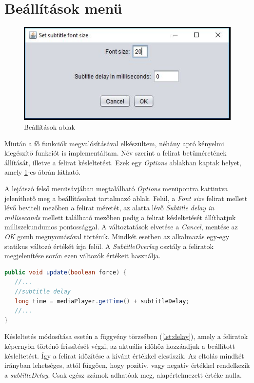 \section{Beállítások menü}

\begin{figure}[h!]
\centering
  \includegraphics[width=0.8\linewidth]{images/options.jpg}
  \caption{Beállítások ablak}
  \label{fig:options}
\end{figure}

Miután a fő funkciók megvalósításával elkészültem, néhány apró kényelmi kiegészítő funkciót is implementáltam. Név szerint a felirat betűméretének állítását, illetve a felirat késleltetést. Ezek egy \textit{Options} ablakban kaptak helyet, amely \ref{fig:options}-es ábrán látható.

A lejátszó felső menüsávjában megtalálható \textit{Options} menüpontra kattintva jeleníthető meg a beállításokat tartalmazó ablak. Felül, a \textit{Font size} felirat mellett lévő beviteli mezőben a felirat méretét, az alatta lévő \textit{Subtitle delay in milliseconds} mellett található mezőben pedig a felirat késleltetését állíthatjuk milliszekundumos pontossággal. A változtatások elvetése a \textit{Cancel}, mentése az \textit{OK} gomb megnyomásával történik. Mindkét esetben az alkalmazás egy-egy statikus változó értékét írja felül. A \textit{SubtitleOverlay} osztály a feliratok megjelenítése során ezen változók értékeit használja.

\begin{lstlisting}[caption=Feliratok késleltetése, label={lst:delay}, language=java]
public void update(boolean force) {
   //...
   //subtitle delay
   long time = mediaPlayer.getTime() + subtitleDelay;
   //...
}
\end{lstlisting}

Késleltetés módosítása esetén a függvény törzsében (\ref{lst:delay}), amely a feliratok képernyőn történő frissítését végzi, az aktuális időhöz hozzáadjuk a beállított késleltetést. Így a felirat időzítése a kívánt értékkel elcsúszik. Az eltolás mindkét irányban lehetséges, attól függően, hogy pozitív, vagy negatív értékkel rendelkezik a \textit{subtitleDelay}. Csak egész számok adhatóak meg, alapértelmezett értéke nulla.

